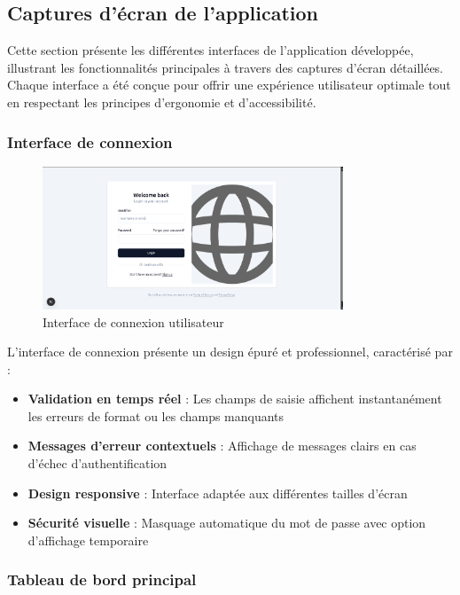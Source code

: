 \documentclass{rapportPfe}
\begin{document}
\subsection{Captures d'écran de l'application}

Cette section présente les différentes interfaces de l'application développée, illustrant les fonctionnalités principales à travers des captures d'écran détaillées. Chaque interface a été conçue pour offrir une expérience utilisateur optimale tout en respectant les principes d'ergonomie et d'accessibilité.

\subsubsection{Interface de connexion}

\begin{figure}[H]
    \centering
    \includegraphics[width=0.8\textwidth]{diagrams/a_ss_02.png}
    \caption{Interface de connexion utilisateur}
    \label{fig:login}
\end{figure}

L'interface de connexion présente un design épuré et professionnel, caractérisé par :
\begin{itemize}
    \item \textbf{Validation en temps réel} : Les champs de saisie affichent instantanément les erreurs de format ou les champs manquants
    \item \textbf{Messages d'erreur contextuels} : Affichage de messages clairs en cas d'échec d'authentification
    \item \textbf{Design responsive} : Interface adaptée aux différentes tailles d'écran
    \item \textbf{Sécurité visuelle} : Masquage automatique du mot de passe avec option d'affichage temporaire
\end{itemize}

\subsubsection{Tableau de bord principal}
\end{document}
